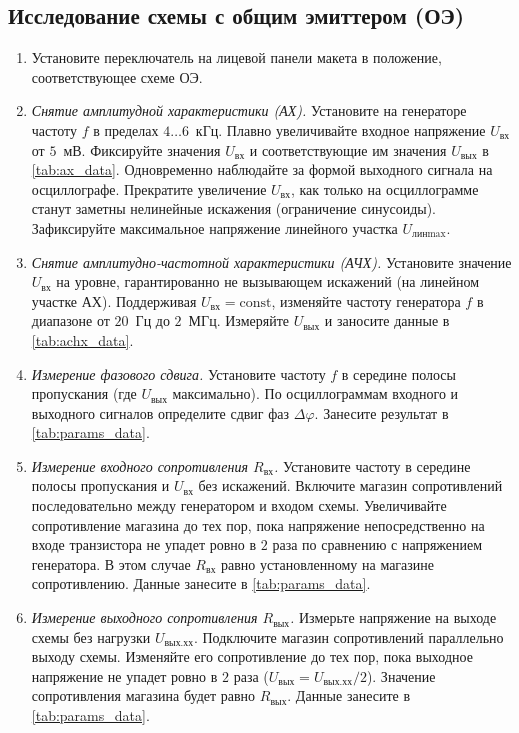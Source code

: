 \subsection*{Исследование схемы с общим эмиттером (ОЭ)}
\begin{enumerate}
    \item Установите переключатель на лицевой панели макета в положение, соответствующее схеме ОЭ.
    \item \textit{Снятие амплитудной характеристики (АХ).}
    Установите на генераторе частоту $f$ в пределах $4 \dots 6$~кГц. Плавно увеличивайте входное напряжение $U_{\text{вх}}$ от $5$~мВ. Фиксируйте значения $U_{\text{вх}}$ и соответствующие им значения $U_{\text{вых}}$ в \cref{tab:ax_data}. Одновременно наблюдайте за формой выходного сигнала на осциллографе. Прекратите увеличение $U_{\text{вх}}$, как только на осциллограмме станут заметны нелинейные искажения (ограничение синусоиды). Зафиксируйте максимальное напряжение линейного участка $U_{\text{лин}\max}$.
    \item \textit{Снятие амплитудно-частотной характеристики (АЧХ).}
    Установите значение $U_{\text{вх}}$ на уровне, гарантированно не вызывающем искажений (на линейном участке АХ). Поддерживая $U_{\text{вх}} = \text{const}$, изменяйте частоту генератора $f$ в диапазоне от $20$~Гц до $2$~МГц. Измеряйте $U_{\text{вых}}$ и заносите данные в \cref{tab:achx_data}.
    \item \textit{Измерение фазового сдвига.}
    Установите частоту $f$ в середине полосы пропускания (где $U_{\text{вых}}$ максимально). По осциллограммам входного и выходного сигналов определите сдвиг фаз $\Delta\varphi$. Занесите результат в \cref{tab:params_data}.
    \item \textit{Измерение входного сопротивления $R_{\text{вх}}$.}
    Установите частоту в середине полосы пропускания и $U_{\text{вх}}$ без искажений. Включите магазин сопротивлений последовательно между генератором и входом схемы. Увеличивайте сопротивление магазина до тех пор, пока напряжение непосредственно на входе транзистора не упадет ровно в $2$ раза по сравнению с напряжением генератора. В этом случае $R_{\text{вх}}$ равно установленному на магазине сопротивлению. Данные занесите в \cref{tab:params_data}.
    \item \textit{Измерение выходного сопротивления $R_{\text{вых}}$.}
    Измерьте напряжение на выходе схемы без нагрузки $U_{\text{вых.хх}}$. Подключите магазин сопротивлений параллельно выходу схемы. Изменяйте его сопротивление до тех пор, пока выходное напряжение не упадет ровно в $2$ раза ($U_{\text{вых}} = U_{\text{вых.хх}} / 2$). Значение сопротивления магазина будет равно $R_{\text{вых}}$. Данные занесите в \cref{tab:params_data}.
\end{enumerate}

